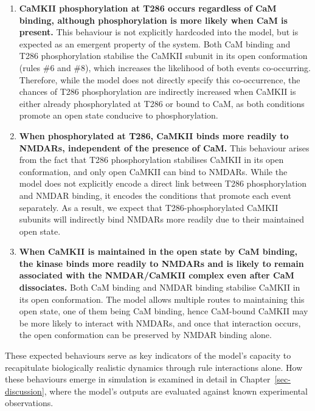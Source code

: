 \documentclass[
  11pt,
  letterpaper,
]{scrreprt}
\begin{document}
\begin{enumerate}
\def\labelenumi{\arabic{enumi}.}
\item
  \textbf{CaMKII phosphorylation at T286 occurs regardless of CaM
  binding, although phosphorylation is more likely when CaM is present.}
  This behaviour is not explicitly hardcoded into the model, but is
  expected as an emergent property of the system. Both CaM binding and
  T286 phosphorylation stabilise the CaMKII subunit in its open
  conformation (rules \#6 and \#8), which increases the likelihood of
  both events co-occurring. Therefore, while the model does not directly
  specify this co-occurrence, the chances of T286 phosphorylation are
  indirectly increased when CaMKII is either already phosphorylated at
  T286 or bound to CaM, as both conditions promote an open state
  conducive to phosphorylation.
\item
  \textbf{When phosphorylated at T286, CaMKII binds more readily to
  NMDARs, independent of the presence of CaM.} This behaviour arises
  from the fact that T286 phosphorylation stabilises CaMKII in its open
  conformation, and only open CaMKII can bind to NMDARs. While the model
  does not explicitly encode a direct link between T286 phosphorylation
  and NMDAR binding, it encodes the conditions that promote each event
  separately. As a result, we expect that T286-phosphorylated CaMKII
  subunits will indirectly bind NMDARs more readily due to their
  maintained open state.
\item
  \textbf{When CaMKII is maintained in the open state by CaM binding,
  the kinase binds more readily to NMDARs and is likely to remain
  associated with the NMDAR/CaMKII complex even after CaM dissociates.}
  Both CaM binding and NMDAR binding stabilise CaMKII in its open
  conformation. The model allows multiple routes to maintaining this
  open state, one of them being CaM binding, hence CaM-bound CaMKII may
  be more likely to interact with NMDARs, and once that interaction
  occurs, the open conformation can be preserved by NMDAR binding alone.
\end{enumerate}

These expected behaviours serve as key indicators of the model's
capacity to recapitulate biologically realistic dynamics through rule
interactions alone. How these behaviours emerge in simulation is
examined in detail in Chapter~\ref{sec-discussion}, where the model's
outputs are evaluated against known experimental observations.

\end{document}
